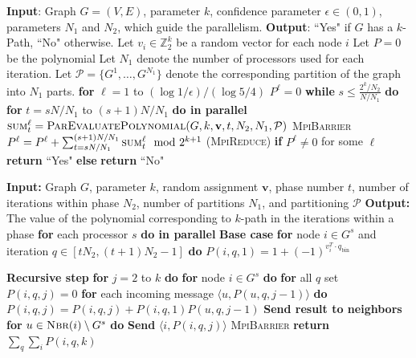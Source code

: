 \begin{algorithm}{}
\small
\caption{\ouralgo{}$(G, k, \epsilon, N_1, N_2)$.}
\label{alg:parallel-kMLD} 
\begin{algorithmic}[1]
\STATE \textbf{Input}: Graph $G=(V,E)$, parameter $k$,
confidence parameter $\epsilon\in (0, 1)$, parameters $N_1$ and $N_2$, which guide the parallelism.
\STATE\textbf{Output}: ``Yes" if $G$ has a $k$-Path, ``No" otherwise.
\STATE 
\STATE Let $v_i \in \mathbb{Z}_2^k$ be a random vector for each node $i$
\STATE Let $P = 0$ be the polynomial
\STATE Let $N_1$ denote the number of processors used for each iteration.
Let $\mathcal{P}=\{G^1, \ldots, G^{N_1}\}$ denote the corresponding partition of the graph into $N_1$ parts.
\STATE \textbf{for} $\ell=1$ to $(\log{1/\epsilon})/(\log{5/4})$ 
\STATE \quad $P^{\ell}=0$
\STATE \quad \textbf{while} $s \leq \frac{2^k/N_2}{N/N_1}$ \textbf{do}
\STATE \quad \quad \textbf{for} $t =s N/N_1$ to $(s+ 1)N/N_1$ \textbf{do in parallel}
\STATE \quad \qquad  $\textsc{sum}^{\ell}_{t} = \textsc{ParEvaluatePolynomial}(G, k, \mathbf{v}, t, N_2, N_1, \mathcal{P})$
\STATE \quad \quad \textsc{MpiBarrier}
\STATE \quad \quad $P^{\ell} = P^{\ell} + \sum_{t=s N/N_1}^{(s+1)N/N_1} \textsc{sum}^{\ell}_{t} \mod 2^{k+1}$ (\textsc{MpiReduce})
\STATE \textbf{if} $P^{\ell}\neq 0$ for some $\ell$
\STATE \quad \textbf{return} ``Yes"
\STATE \textbf{else} 
\STATE \quad \textbf{return} ``No"
\end{algorithmic}
\end{algorithm}

\begin{algorithm}{}
\small
\caption{}
\label{alg:parEvaluate} 
\begin{algorithmic}[1]
\STATE \textbf{Input:} Graph $G$, parameter $k$, random assignment $\mathbf{v}$, phase number $t$, number of iterations within phase $N_2$, number of partitions $N_1$, and partitioning $\mathcal{P}$
\STATE \textbf{Output:} The value of the polynomial corresponding to $k$-path in the iterations within a phase
\STATE
\STATE \textbf{for} each processor $s$ \textbf{do in parallel}
\STATE \quad \textbf{Base case}
\STATE \quad \textbf{for} node $i \in G^s$ and iteration $q \in [tN_2,(t+1)N_2-1]$ \textbf{do}
\STATE \qquad $ P(i, q, 1) = 1 + (-1)^{v_i^T \cdot q_{\text{bin}}}$

\STATE \quad \textbf{Recursive step}
\STATE \quad \textbf{for} $j=2$ to $k$ \textbf{do}
\STATE \qquad \textbf{for} node $i \in G^s$ \textbf{do}
\STATE \qquad \quad \textbf{for} all $q$ set $P(i,q,  j) = 0$
\STATE \qquad \quad \textbf{for} each incoming message $\langle u, P(u, q, j-1)\rangle$ \textbf{do}
\STATE \qquad \qquad $P(i, q, j)= P(i, q, j) + P(i, q, 1)  P(u, q, j-1)$
\STATE \qquad \quad  \textbf{Send result to neighbors}
\STATE \qquad \quad \textbf{for} $u \in \textsc{Nbr}(i)\setminus G^s$ \textbf{do}
\STATE \qquad \qquad \textbf{Send} $\langle i, P(i, q, j)\rangle$
\STATE \textsc{MpiBarrier}
\STATE \textbf{return} $\sum_q \sum_i P(i, q, k)$
\end{algorithmic}
\end{algorithm}


